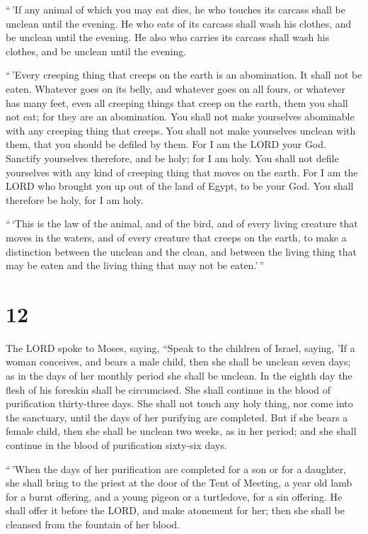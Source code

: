  ``\,'If any animal of which you may eat dies, he who
touches its carcass shall be unclean until the evening.  He
who eats of its carcass shall wash his clothes, and be unclean until the
evening. He also who carries its carcass shall wash his clothes, and be
unclean until the evening.

 ``\,'Every creeping thing that creeps on the earth is an
abomination. It shall not be eaten.  Whatever goes on its
belly, and whatever goes on all fours, or whatever has many feet, even
all creeping things that creep on the earth, them you shall not eat; for
they are an abomination.  You shall not make yourselves
abominable with any creeping thing that creeps. You shall not make
yourselves unclean with them, that you should be defiled by them.
 For I am the LORD your God. Sanctify yourselves therefore,
and be holy; for I am holy. You shall not defile yourselves with any
kind of creeping thing that moves on the earth.  For I am
the LORD who brought you up out of the land of Egypt, to be your God.
You shall therefore be holy, for I am holy.

 ``\,`This is the law of the animal, and of the bird, and
of every living creature that moves in the waters, and of every creature
that creeps on the earth,  to make a distinction between
the unclean and the clean, and between the living thing that may be
eaten and the living thing that may not be eaten.'\,''

\hypertarget{section-11}{%
\section{12}\label{section-11}}

 The LORD spoke to Moses, saying,  ``Speak to
the children of Israel, saying, 'If a woman conceives, and bears a male
child, then she shall be unclean seven days; as in the days of her
monthly period she shall be unclean.  In the eighth day the
flesh of his foreskin shall be circumcised.  She shall
continue in the blood of purification thirty-three days. She shall not
touch any holy thing, nor come into the sanctuary, until the days of her
purifying are completed.  But if she bears a female child,
then she shall be unclean two weeks, as in her period; and she shall
continue in the blood of purification sixty-six days.

 ``\,'When the days of her purification are completed for a
son or for a daughter, she shall bring to the priest at the door of the
Tent of Meeting, a year old lamb for a burnt offering, and a young
pigeon or a turtledove, for a sin offering.  He shall offer
it before the LORD, and make atonement for her; then she shall be
cleansed from the fountain of her blood.

